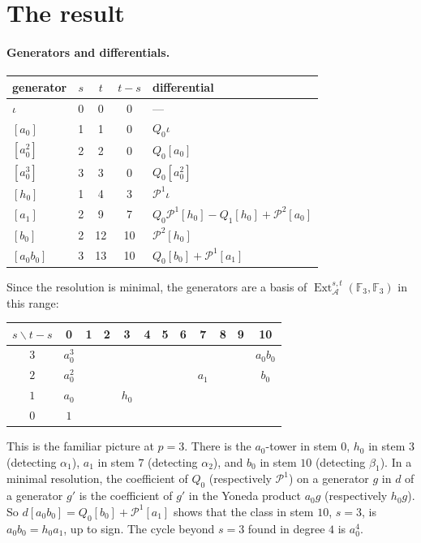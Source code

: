 \documentclass[11pt]{article}
\renewcommand{\P}{\mathcal{P}}
\newcommand{\F}{\mathbb{F}_3}
\newcommand{\A}{\mathcal{A}}
\DeclareMathOperator{\Ext}{Ext}
\begin{document}
\section{The result}

\paragraph{Generators and differentials.}
\begin{center}
\begin{tabular}{lcccl}
\toprule
generator & $s$ & $t$ & $t-s$ & differential \\
\midrule
$\iota$ & 0 & 0 & 0 & --- \\
$[a_0]$ & 1 & 1 & 0 & $Q_{0}\iota$ \\
$[a_0^2]$ & 2 & 2 & 0 & $Q_{0}[a_0]$ \\
$[a_0^3]$ & 3 & 3 & 0 & $Q_{0}[a_0^2]$ \\
$[h_0]$ & 1 & 4 & 3 & $\P^{1}\iota$ \\
$[a_1]$ & 2 & 9 & 7 & $Q_{0}\P^{1}[h_0] - Q_{1}[h_0] + \P^{2}[a_0]$ \\
$[b_0]$ & 2 & 12 & 10 & $\P^{2}[h_0]$ \\
$[a_0b_0]$ & 3 & 13 & 10 & $Q_{0}[b_0] + \P^{1}[a_1]$ \\
\bottomrule
\end{tabular}
\end{center}
Since the resolution is minimal, the generators are a basis of $\Ext_\A^{s,t}(\F,\F)$ in this
range:
\begin{center}
\begin{tabular}{c|ccccccccccc}
$s \backslash t-s$ & 0 & 1 & 2 & 3 & 4 & 5 & 6 & 7 & 8 & 9 & 10 \\
\midrule
$3$ & $a_0^3$ &  &  &  &  &  &  &  &  &  & $a_0b_0$ \\
$2$ & $a_0^2$ &  &  &  &  &  &  & $a_1$ &  &  & $b_0$ \\
$1$ & $a_0$ &  &  & $h_0$ &  &  &  &  &  &  &  \\
$0$ & $1$ &  &  &  &  &  &  &  &  &  &  \\
\end{tabular}
\end{center}
This is the familiar picture at $p = 3$. There is the $a_0$-tower in stem $0$, $h_0$ in stem
$3$ (detecting $\alpha_1$), $a_1$ in stem $7$ (detecting $\alpha_2$), and $b_0$ in stem $10$
(detecting $\beta_1$). In a minimal resolution, the coefficient of $Q_0$ (respectively $\P^1$)
on a generator $g$ in $d$ of a generator $g'$ is the coefficient of $g'$ in the Yoneda product
$a_0 g$ (respectively $h_0 g$). So $d[a_0b_0] = Q_0[b_0] + \P^1[a_1]$ shows that the class in
stem $10$, $s = 3$, is $a_0 b_0 = h_0 a_1$, up to sign. The cycle beyond $s = 3$ found in
degree $4$ is $a_0^4$.
\end{document}
